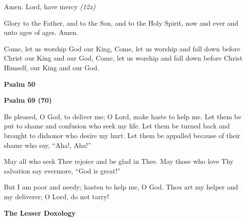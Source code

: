 \begin{hang}
\noindent{}Amen.  Lord, have mercy \textit{(12x)}

Glory to the Father, and to the Son, and to the Holy Spirit, now and ever and unto ages of ages. Amen.

Come, let us worship God our King, Come, let us worship and fall down before 
Christ our King and our God, Come, let us worship and fall down before Christ 
Himself, our King and our God.

\end{hang}

\begin{center}
\textbf{Psalm 50}
\end{center}

\begin{hang}


\end{hang}

\newpage
\begin{center}
\textbf{Psalm 69 (70)}
\end{center}

\begin{hang}
\noindent\makebox[\indt][l]{}Be pleased, O God, to deliver me; O Lord, make 
haste to help me.  Let them be put to shame and confusion who seek my life.  
Let them be turned back and brought to dishonor who desire my hurt.  Let them 
be appalled because of their shame who say, ``Aha!, Aha!''

May all who seek Thee rejoice and be glad in Thee.  May those who love Thy 
salvation say evermore, ``God is great!''

But I am poor and needy; hasten to help me, O God.  Thou art my helper and my 
deliverer; O Lord, do not tarry!

\end{hang}

\begin{center}
\textbf{The Lesser Doxology}
\end{center}


